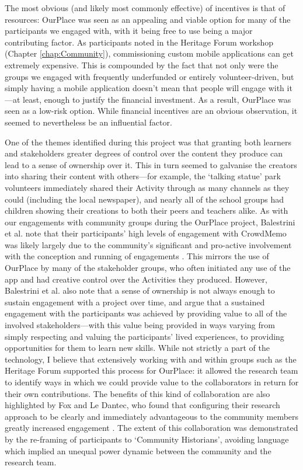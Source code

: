 The most obvious (and likely most commonly effective) of incentives is that of resources: OurPlace was seen as an appealing and viable option for many of the participants we engaged with, with it being free to use being a major contributing factor. As participants noted in the Heritage Forum workshop (Chapter \ref{chap:Community}), commissioning custom mobile applications can get extremely expensive. This is compounded by the fact that not only were the groups we engaged with frequently underfunded or entirely volunteer-driven, but simply having a mobile application doesn't mean that people will engage with it---at least, enough to justify the financial investment. As a result, OurPlace was seen as a low-risk option. While financial incentives are an obvious observation, it seemed to nevertheless be an influential factor.

One of the themes identified during this project was that granting both learners and stakeholders greater degrees of control over the content they produce can lead to a sense of ownership over it. This in turn seemed to galvanise the creators into sharing their content with others---for example, the `talking statue' park volunteers immediately shared their Activity through as many channels as they could (including the local newspaper), and nearly all of the school groups had children showing their creations to both their peers and teachers alike. As with our engagements with community groups during the OurPlace project, Balestrini et al. note that their participants' high levels of engagement with CrowdMemo was likely largely due to the community's significant and pro-active involvement with the conception and running of engagements \citep{Balestrini2014}. This mirrors the use of OurPlace by many of the stakeholder groups, who often initiated any use of the app and had creative control over the Activities they produced. However, Balestrini et al. also note that a sense of ownership is not always enough to sustain engagement with a project over time, and argue that a sustained engagement with the participants was achieved by providing value to all of the involved stakeholders---with this value being provided in ways varying from simply respecting and valuing the participants' lived experiences, to providing opportunities for them to learn new skills. While not strictly a part of the technology, I believe that extensively working with and within groups such as the Heritage Forum supported this process for OurPlace: it allowed the research team to identify ways in which we could provide value to the collaborators in return for their own contributions. The benefits of this kind of collaboration are also highlighted by Fox and Le Dantec, who found that configuring their research approach to be clearly and immediately advantageous to the community members greatly increased engagement \citep{Fox2014}. The extent of this collaboration was demonstrated by the re-framing of participants to `Community Historians', avoiding language which implied an unequal power dynamic between the community and the research team.

